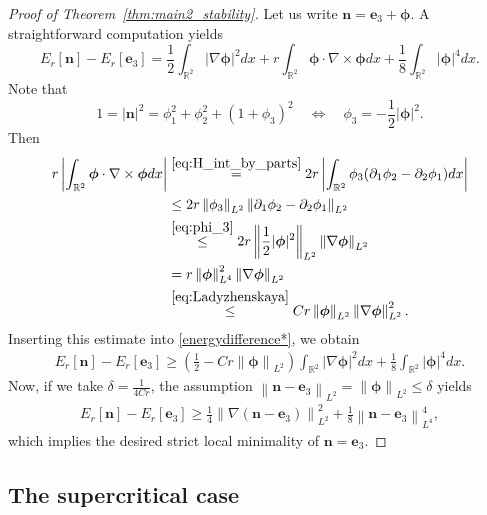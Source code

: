 \documentclass{amsart}
\numberwithin{equation}{section}
\theoremstyle{definition}
\theoremstyle{remark}
\newcommand{\R}{\mathbb{R}}
\newcommand{\nor}[2]{\left\| {#1} \right\|_{#2}}		%
\newcommand{\rd}{{\partial}}								%
\newcommand{\nab}{{\nabla}}							%
\newcommand{\bn}{{\mathbf{n}}}
\newcommand{\boe}{{\mathbf{e}}}
\newcommand{\bphi}{{\bm{\phi}}}
\begin{document}
\begin{proof}[Proof of Theorem~\ref{thm:main2_stability}]
Let us write $\bn = \boe_3 + \bphi$. A straightforward computation yields
\begin{equation}\label{energydifference*}
E_r[\bn] - E_r[\boe_3] = 
\frac 12 \int_{\R^2} |\nab \bphi|^2 dx 
+ r\int_{\R^2} \bphi \cdot \nab \times \bphi dx 
+ \frac 18 \int_{\R^2} |\bphi|^4 dx.
\end{equation}
Note that
\begin{equation}\label{eq:phi_3}
1= |\bn|^2 = \phi_1^2 + \phi_2^2 + (1+\phi_3)^2 \quad
\Longleftrightarrow
\quad
\phi_3 = -\frac 12 |\bphi|^2.
\end{equation}
Then
\begin{align}
r \left| \int_{\R^2} \bphi \cdot \nab \times \bphi dx\right| 
&\stackrel{\eqref{eq:H_int_by_parts}}{=} 2
r \left|\int_{\R^2} \phi_3 (\rd_1 \phi_2 - \rd_2 \phi_1) dx\right| \notag\\
&\le 2
r \nor{\phi_3}{L^2} \nor{\rd_1 \phi_2 - \rd_2 \phi_1}{L^2}\notag \\
&\stackrel{\eqref{eq:phi_3}}{\le}
2r \nor{\frac 12 |\bphi|^2}{L^2} \nor{\nab \bphi}{L^2} \notag \\
&=
r \nor{\bphi}{L^4}^2 \nor{\nab \bphi}{L^2}\label{ineq:phi}\\
&\stackrel{\eqref{eq:Ladyzhenskaya}}{\le} Cr \nor{\bphi}{L^2} \nor{\nab \bphi}{L^2}^2.\notag
\end{align}
Inserting this estimate into \eqref{energydifference*}, we obtain
\begin{align*}
E_r [\bn] - E_r[\boe_3] \geq \left(\frac{1}{2}-Cr\nor{\bphi}{L^2}\right)\int_{\R^2} |\nab \bphi|^2 dx +\frac18\int_{\R^2} |\bphi|^4 dx.
\end{align*}
Now, if we take $\delta=\frac1{4Cr}$, the assumption $\nor{\bn-\boe_3}{L^2}=\nor{\bphi}{L^2}\leq\delta$ yields
\begin{align*}
E_r [\bn] - E_r[\boe_3] \geq \frac{1}{4}\nor{\nabla(\bn-\boe_3)}{L^2}^2 + \frac{1}{8}\nor{\bn-\boe_3}{L^4}^4,
\end{align*}
which implies the desired strict local minimality of $\bn=\boe_3$.
\end{proof}



\subsection{The supercritical case}
\end{document}

